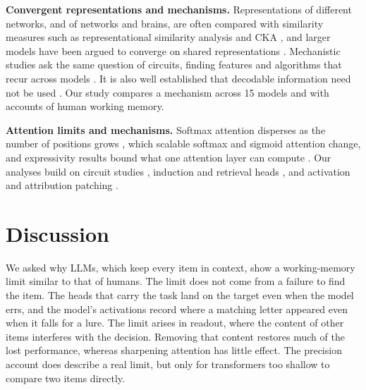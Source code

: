 \documentclass{article}
\begin{document}
\textbf{Convergent representations and mechanisms.} Representations of different networks, and of networks and brains, are often compared with similarity measures such as representational similarity analysis and CKA \citep{kriegeskorte2008rsa,kornblith2019similarity,sucholutsky2023alignment}, and larger models have been argued to converge on shared representations \citep{huh2024platonic}. Mechanistic studies ask the same question of circuits, finding features and algorithms that recur across models \citep{olah2020zoom,chughtai2023toy,gurnee2024universal}. It is also well established that decodable information need not be used \citep{dewit2016neuroimaging,hewitt2019control,ravichander2021probing,elazar2021amnesic}. Our study compares a mechanism across 15 models and with accounts of human working memory.

\textbf{Attention limits and mechanisms.} Softmax attention disperses as the number of positions grows \citep{velickovic2025softmax,hayase2026critical}, which scalable softmax \citep{nakanishi2025scalable} and sigmoid attention \citep{ramapuram2024sigmoid} change, and expressivity results bound what one attention layer can compute \citep{hahn2020limitations,sanford2023representational}. Our analyses build on circuit studies \citep{elhage2021framework,wang2023ioi}, induction and retrieval heads \citep{olsson2022induction,wu2024retrieval}, and activation and attribution patching \citep{zhang2024patching,kramar2024atp}.

\section{Discussion}
\label{sec:discussion}

We asked why LLMs, which keep every item in context, show a working-memory limit similar to that of humans. The limit does not come from a failure to find the item. The heads that carry the task land on the target even when the model errs, and the model's activations record where a matching letter appeared even when it falls for a lure. The limit arises in readout, where the content of other items interferes with the decision. Removing that content restores much of the lost performance, whereas sharpening attention has little effect. The precision account does describe a real limit, but only for transformers too shallow to compare two items directly.
\end{document}
